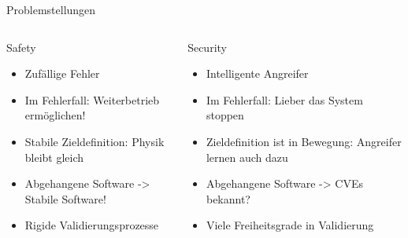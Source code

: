 \begin{frame}[T]{Problemstellungen}
\small
  \begin{columns}[t,fullwidth]
   \hfill
    \begin{column}{.45\linewidth}
      \begin{block}{Safety}
      \begin{itemize}
        \item Zufällige Fehler
        \item Im Fehlerfall: Weiterbetrieb ermöglichen!
        \item Stabile Zieldefinition: Physik bleibt gleich
        \item Abgehangene Software -> Stabile Software!
        \item Rigide Validierungsprozesse
      \end{itemize}
      \end{block}
    \end{column}
    \hfill
    \begin{column}{.45\linewidth}
      \begin{block}{Security}
      \begin{itemize}
        \item Intelligente Angreifer
        \item Im Fehlerfall: Lieber das System stoppen
        \item Zieldefinition ist in Bewegung: Angreifer lernen auch dazu
        \item Abgehangene Software -> CVEs bekannt?
        \item Viele Freiheitsgrade in Validierung
      \end{itemize}
      \end{block}
    \end{column}
    \hfill
  \end{columns}
\end{frame}

